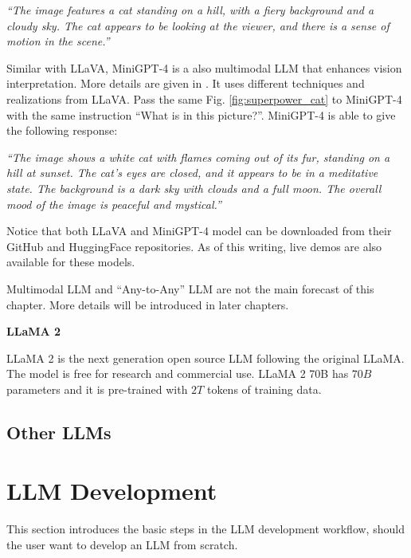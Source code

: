 \vspace{0.1in}
\noindent \textit{``The image features a cat standing on a hill, with a fiery background and a cloudy sky. The cat appears to be looking at the viewer, and there is a sense of motion in the scene.''}
\vspace{0.1in}

Similar with LLaVA, MiniGPT-4 is a also multimodal LLM that enhances vision interpretation. More details are given in \cite{zhu2023minigpt}. It uses different techniques and realizations from LLaVA. Pass the same Fig. \ref{fig:superpower_cat} to MiniGPT-4 with the same instruction ``What is in this picture?''. MiniGPT-4 is able to give the following response:

\vspace{0.1in}
\noindent \textit{``The image shows a white cat with flames coming out of its fur, standing on a hill at sunset. The cat’s eyes are closed, and it appears to be in a meditative state. The background is a dark sky with clouds and a full moon. The overall mood of the image is peaceful and mystical.''}
\vspace{0.1in}

Notice that both LLaVA and MiniGPT-4 model can be downloaded from their GitHub and HuggingFace repositories. As of this writing, live demos are also available for these models.

Multimodal LLM and ``Any-to-Any'' LLM are not the main forecast of this chapter. More details will be introduced in later chapters.

\vspace{0.1in}
\noindent \textbf{LLaMA 2}
\vspace{0.1in}

LLaMA 2 is the next generation open source LLM following the original LLaMA. The model is free for research and commercial use. LLaMA 2 70B has $70B$ parameters and it is pre-trained with $2T$ tokens of training data.

\subsection{Other LLMs}

\section{LLM Development}

This section introduces the basic steps in the LLM development workflow, should the user want to develop an LLM from scratch.

